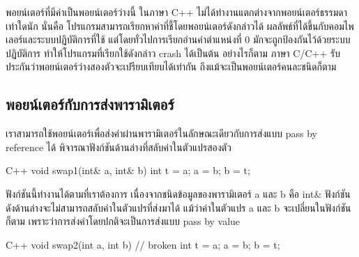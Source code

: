พอยน์เตอร์ที่{\wbr}มี{\wbr}ค่า{\wbr}เป็น{\wbr}พอยน์เตอร์{\wbr}ว่าง{\wbr}นี้ ใน{\wbr}ภาษา C++
ไม่{\wbr}ได้{\wbr}ทำงาน{\wbr}แตกต่าง{\wbr}จาก{\wbr}พอยน์เตอร์{\wbr}ธรรมดา{\wbr}เท่าใด{\wbr}นัก นั่น{\wbr}คือ{\wbr}
โปรแกรม{\wbr}สามารถ{\wbr}เรียกหา{\wbr}ค่า{\wbr}ที่{\wbr}ชี้{\wbr}โดย{\wbr}พอยน์เตอร์{\wbr}ดังกล่าว{\wbr}ได้{\wbr}
ผลลัพธ์{\wbr}ที่{\wbr}ได้{\wbr}ขึ้น{\wbr}กับ{\wbr}คอม{\wbr}ไพ{\wbr}เลอร์{\wbr}และ{\wbr}ระบบปฏิบัติการ{\wbr}ที่{\wbr}ใช้ แต่{\wbr}โดย{\wbr}ทั่วไป{\wbr}การ{\wbr}เรียก{\wbr}อ่าน{\wbr}ค่า{\wbr}ตำแหน่ง{\wbr}ที่ 0
มักจะ{\wbr}ถูก{\wbr}ป้องกัน{\wbr}ไว้{\wbr}ด้วย{\wbr}ระบบปฏิบัติการ ทำ{\wbr}ให้{\wbr}โปรแกรม{\wbr}ที่{\wbr}เรียก{\wbr}ใช้{\wbr}ดังกล่าว crash ได้{\wbr}เป็นต้น{\wbr}
อย่างไรก็ตาม ภาษา C/C++ รับประกัน{\wbr}ว่า{\wbr}พอยน์เตอร์{\wbr}ว่าง{\wbr}สอง{\wbr}ตัว{\wbr}จะ{\wbr}เปรียบเทียบ{\wbr}ได้{\wbr}เท่า{\wbr}กัน{\wbr}
ถึงแม้{\wbr}จะ{\wbr}เป็น{\wbr}พอยน์เตอร์{\wbr}คน{\wbr}ละ{\wbr}ชนิด{\wbr}ก็ตาม{\wbr}

\subsection{พอยน์เตอร์กับ{\wbr}การ{\wbr}ส่ง{\wbr}พารามิเตอร์}
เรา{\wbr}สามารถ{\wbr}ใช้{\wbr}พอยน์เตอร์{\wbr}เพื่อ{\wbr}ส่ง{\wbr}ค่า{\wbr}ผ่าน{\wbr}พารามิเตอร์{\wbr}ใน{\wbr}ลักษณะ{\wbr}เดียวกับ{\wbr}การ{\wbr}ส่ง{\wbr}แบบ pass by
reference ได้ พิจารณา{\wbr}ฟังก์ชัน{\wbr}ด้าน{\wbr}ล่าง{\wbr}ที่{\wbr}สลับ{\wbr}ค่า{\wbr}ใน{\wbr}ตัวแปร{\wbr}สอง{\wbr}ตัว{\wbr}

\latintext
\begin{codelist}{C++}{}
void swap1(int& a, int& b)
{
  int t = a;
  a = b;
  b = t;
}
\end{codelist}
\thaitext

ฟังก์ชัน{\wbr}นี้{\wbr}ทำงาน{\wbr}ได้{\wbr}ตาม{\wbr}ที่{\wbr}เรา{\wbr}ต้องการ เนื่องจาก{\wbr}ชนิด{\wbr}ข้อมูล{\wbr}ของ{\wbr}พารามิเตอร์ {\ct a} และ {\ct
  b} คือ {\ct int\&} ฟังก์ชัน{\wbr}ดัง{\wbr}ด้าน{\wbr}ล่าง{\wbr}จะ{\wbr}ไม่{\wbr}สามารถ{\wbr}สลับ{\wbr}ค่า{\wbr}ใน{\wbr}ตัวแปร{\wbr}ที่{\wbr}ส่ง{\wbr}มา{\wbr}ได้{\wbr}
แม้ว่า{\wbr}ค่า{\wbr}ใน{\wbr}ตัวแปร {\ct a} และ {\ct b} จะ{\wbr}เปลี่ยน{\wbr}ใน{\wbr}ฟังก์ชัน{\wbr}ก็ตาม{\wbr}
เพราะว่า{\wbr}การ{\wbr}ส่ง{\wbr}ค่า{\wbr}โดย{\wbr}ปกติ{\wbr}จะ{\wbr}เป็น{\wbr}การ{\wbr}ส่ง{\wbr}แบบ pass by value

\latintext
\begin{codelist}{C++}{}
void swap2(int a, int b)    // broken
{
  int t = a;
  a = b;
  b = t;
}
\end{codelist}
\thaitext

